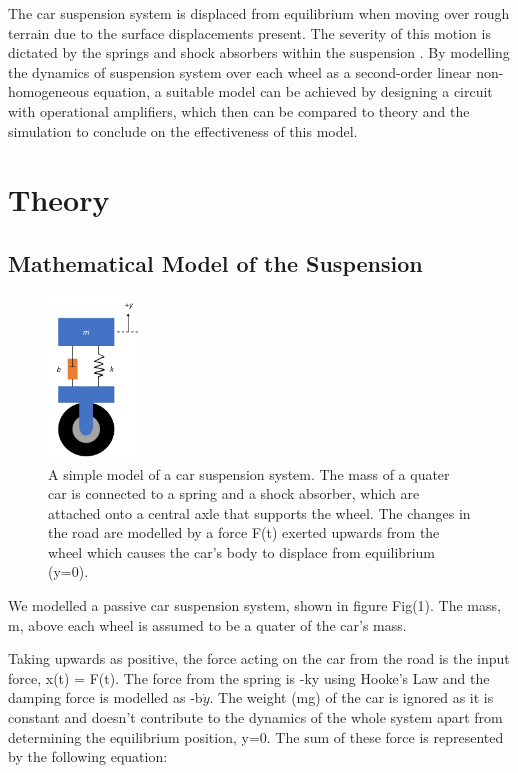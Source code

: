 \documentclass[journal]{Imperial_lab_report}
\begin{document}
The car suspension system is displaced from equilibrium when moving over rough terrain due to the surface displacements present. The severity of this motion is dictated by the springs and shock absorbers within the suspension \cite{mechanic}. By modelling the dynamics of suspension system \cite{suspensionmodel} over each wheel as a second-order linear non-homogeneous equation, a suitable model can be achieved by designing a circuit with operational amplifiers, which then can be compared to theory and the simulation to conclude on the effectiveness of this model.  

\section{Theory}

\subsection{Mathematical Model of the Suspension}

\begin{figure}[h]
    \centering
    \includegraphics[width=2.5cm]{simple model.png}
    \caption{
    A simple model of a car suspension system. The mass of a quater car is connected to a spring and a shock absorber, which are attached onto a central axle that supports the wheel. The changes in the road are modelled by a force F(t) exerted upwards from the wheel which causes the car's body to displace from equilibrium (y=0).
    }
    

    \label{fig:simple model}
\end{figure}

We modelled a passive car suspension system, shown in figure Fig(1). The mass, m, above each wheel is assumed to be a quater of the car's mass.

Taking upwards as positive, the force acting on the car from the road is the input force, x(t) = F(t). The force from the spring is -ky using Hooke's Law and the damping force is modelled as  -b$\dot{y}$. The weight (mg) of the car is ignored as it is constant and doesn't contribute to the dynamics of the whole system apart from determining the equilibrium position, y=0. The sum of these force is represented by the following equation:
\end{document}
